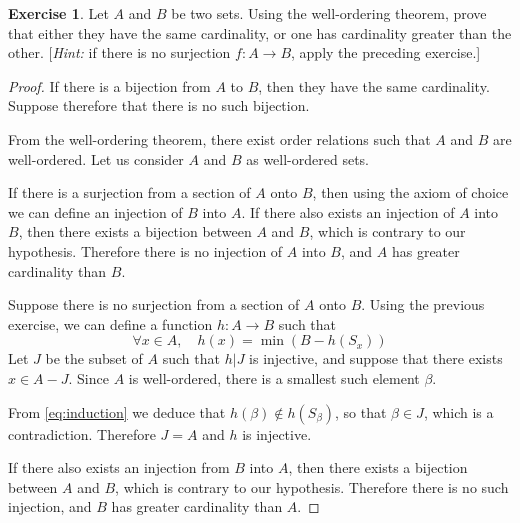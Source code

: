 \documentclass[11pt,a4paper,twoside]{article}
\theoremstyle{definition}
\newcounter{excounter}
\newtheorem{exercise}[excounter]{Exercise}
\begin{document}
\begin{exercise}

  Let $A$ and $B$ be two sets. Using the well-ordering theorem, prove that either they have the same cardinality,
  or one has cardinality greater than the other. [\emph{Hint:} if there is no surjection $f : A \to B$, apply
  the preceding exercise.]

\end{exercise}

\begin{proof}

  If there is a bijection from $A$ to $B$, then they have the same cardinality. Suppose therefore that there is
  no such bijection.

  From the well-ordering theorem, there exist order relations such that $A$ and $B$ are well-ordered. Let us consider
  $A$ and $B$ as well-ordered sets.

  If there is a surjection from a section of $A$ onto $B$, then using the axiom of choice we can define an injection
  of $B$ into $A$. If there also exists an injection of $A$ into $B$, then there exists a bijection between $A$ and $B$,
  which is contrary to our hypothesis. Therefore there is no injection of $A$ into $B$, and $A$ has greater cardinality than $B$.

  Suppose there is no surjection from a section of $A$ onto $B$. Using the previous exercise, we can define a function
  $h : A \to B$ such that
  \begin{equation} \label{eq:induction}
    \forall x \in A, \quad h ( x ) = \min ( B - h ( S_x ) )
  \end{equation}
  Let $J$ be the subset of $A$ such that $h|J$ is injective, and suppose that there exists $x \in A - J$.
  Since $A$ is well-ordered, there is a smallest such element $\beta$.

  From \eqref{eq:induction} we deduce that $h ( \beta ) \notin h ( S_\beta )$, so that $\beta \in J$, which is a contradiction.
  Therefore $J = A$ and $h$ is injective.

  If there also exists an injection from $B$ into $A$, then there exists a bijection between $A$ and $B$, which is contrary to
  our hypothesis. Therefore there is no such injection, and $B$ has greater cardinality than $A$.

\end{proof}
\end{document}
